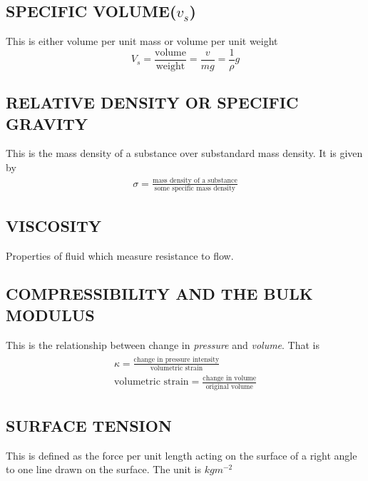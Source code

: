 \documentclass[11pt]{report}
\newcommand{\sps}{\\[0.2cm]}
\newcommand{\tti}[1]{\textit{#1}}
\begin{document}
	\subsection{SPECIFIC VOLUME($v_s$)}
	This is either volume per unit mass or volume per unit weight
	\begin{equation*}
		V_s = \frac{\text{volume}}{\text{weight}} = \frac{v}{mg}=\frac{1}{\rho}g
	\end{equation*}
	
	\subsection{RELATIVE DENSITY OR SPECIFIC GRAVITY}
	This is the mass density of a substance over substandard mass density. It is given by
	\begin{eqnarray*}
		\sigma = \frac{\text{mass density of a substance}}{\text{some specific mass density}}
	\end{eqnarray*}
	
	\subsection{VISCOSITY}
	Properties of fluid which measure resistance to flow.
	
	\subsection{COMPRESSIBILITY AND THE BULK MODULUS}
	This is the relationship between change in \tti{pressure} and \tti{volume}. That is
	\begin{eqnarray*}
		\begin{array}{l}
			\kappa = \frac{\text{change in pressure intensity}}{\text{volumetric strain}}\sps
			\text{volumetric strain} = \frac{\text{change in volume}}{\text{original volume}}
		\end{array}
	\end{eqnarray*}
	
	\subsection{SURFACE TENSION}
	This is defined as the force per unit length acting on the surface of a right angle to one line drawn on the surface. The unit is $kgm^{-2}$
	
\end{document}

